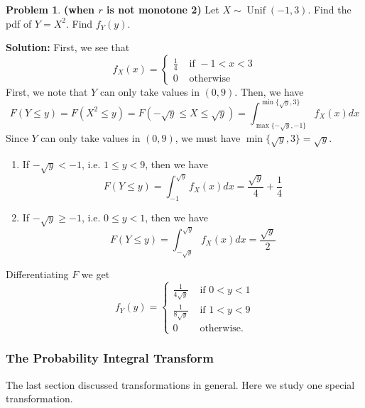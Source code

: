 \documentclass[13pt]{article}
\theoremstyle{definition}
\newtheorem{problem}[theorem]{Problem}
\newenvironment{solution}
{\color{C2}\begin{framed}\begingroup\textbf{Solution:} }
  {\endgroup\end{framed}}
\theoremstyle{remark}
\begin{document}
\begin{problem}
    \textbf{(when $r$ is not monotone 2)} Let $X \sim \operatorname{Unif}(-1,3)$. Find the pdf of $Y=X^{2}$. Find $f_Y(y)$.
\end{problem}
\begin{solution}
    First, we see that
$$
f_{X}(x)= \begin{cases}\frac{1}{4} & \text { if }-1<x<3 \\ 0 & \text { otherwise }\end{cases}
$$
First, we note that $Y$ can only take values in $(0,9)$. Then, we have
\[
F(Y\le y) = F(X^2\le y) = F(-\sqrt{y}\le X\le \sqrt{y}) = \int_{\max\{-\sqrt{y},-1\}}^{\min\{\sqrt{y},3\}} f_X(x)dx
\]
Since $Y$ can only take values in $(0,9)$, we must have $\min\{\sqrt{y},3\}=\sqrt{y}$. 
\begin{enumerate}[label=(\roman*)]
    \item If $-\sqrt{y}<-1$, i.e. $1\le y < 9$, then we have 
    \[
    F(Y\le y) = \int_{-1}^{\sqrt{y}} f_X(x)dx = \frac{\sqrt{y}}{4}+\frac{1}{4}
    \]
    \item If $-\sqrt{y}\ge-1$, i.e. $0\le y < 1$, then we have 
    \[
    F(Y\le y) = \int_{-\sqrt{y}}^{\sqrt{y}} f_X(x)dx = \frac{\sqrt{y}}{2}
    \]
\end{enumerate}
Differentiating $F$ we get
$$
f_{Y}(y)= \begin{cases}\frac{1}{4 \sqrt{y}} & \text { if } 0<y<1 \\ \frac{1}{8 \sqrt{y}} & \text { if } 1<y<9 \\ 0 & \text { otherwise. }\end{cases}
$$
\end{solution}

\subsubsection{The Probability Integral Transform}
The last section discussed transformations in general. Here we study one special transformation. 
\end{document}
